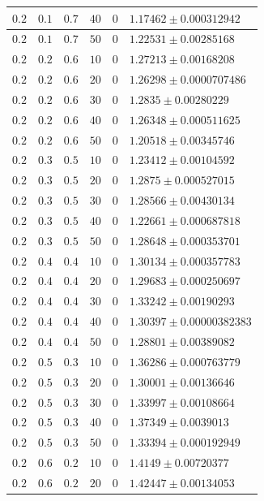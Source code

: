 \documentclass[14pt]{extreport}
\begin{document}
\begin{center}
\begin{longtable}{|p{1cm}|p{1cm}|p{1cm}|p{1cm}|p{1cm}|p{8cm}|}
$0.2$ & $0.1$ & $0.7$ & $40$ & $0$ & $1.17462 \pm 0.000312942$ \\ \hline
$0.2$ & $0.1$ & $0.7$ & $50$ & $0$ & $1.22531 \pm 0.00285168$ \\ \hline
$0.2$ & $0.2$ & $0.6$ & $10$ & $0$ & $1.27213 \pm 0.00168208$ \\ \hline
$0.2$ & $0.2$ & $0.6$ & $20$ & $0$ & $1.26298 \pm 0.0000707486$ \\ \hline
$0.2$ & $0.2$ & $0.6$ & $30$ & $0$ & $1.2835 \pm 0.00280229$ \\ \hline
$0.2$ & $0.2$ & $0.6$ & $40$ & $0$ & $1.26348 \pm 0.000511625$ \\ \hline
$0.2$ & $0.2$ & $0.6$ & $50$ & $0$ & $1.20518 \pm 0.00345746$ \\ \hline
$0.2$ & $0.3$ & $0.5$ & $10$ & $0$ & $1.23412 \pm 0.00104592$ \\ \hline
$0.2$ & $0.3$ & $0.5$ & $20$ & $0$ & $1.2875 \pm 0.000527015$ \\ \hline
$0.2$ & $0.3$ & $0.5$ & $30$ & $0$ & $1.28566 \pm 0.00430134$ \\ \hline
$0.2$ & $0.3$ & $0.5$ & $40$ & $0$ & $1.22661 \pm 0.000687818$ \\ \hline
$0.2$ & $0.3$ & $0.5$ & $50$ & $0$ & $1.28648 \pm 0.000353701$ \\ \hline
$0.2$ & $0.4$ & $0.4$ & $10$ & $0$ & $1.30134 \pm 0.000357783$ \\ \hline
$0.2$ & $0.4$ & $0.4$ & $20$ & $0$ & $1.29683 \pm 0.000250697$ \\ \hline
$0.2$ & $0.4$ & $0.4$ & $30$ & $0$ & $1.33242 \pm 0.00190293$ \\ \hline
$0.2$ & $0.4$ & $0.4$ & $40$ & $0$ & $1.30397 \pm 0.00000382383$ \\ \hline
$0.2$ & $0.4$ & $0.4$ & $50$ & $0$ & $1.28801 \pm 0.00389082$ \\ \hline
$0.2$ & $0.5$ & $0.3$ & $10$ & $0$ & $1.36286 \pm 0.000763779$ \\ \hline
$0.2$ & $0.5$ & $0.3$ & $20$ & $0$ & $1.30001 \pm 0.00136646$ \\ \hline
$0.2$ & $0.5$ & $0.3$ & $30$ & $0$ & $1.33997 \pm 0.00108664$ \\ \hline
$0.2$ & $0.5$ & $0.3$ & $40$ & $0$ & $1.37349 \pm 0.0039013$ \\ \hline
$0.2$ & $0.5$ & $0.3$ & $50$ & $0$ & $1.33394 \pm 0.000192949$ \\ \hline
$0.2$ & $0.6$ & $0.2$ & $10$ & $0$ & $1.4149 \pm 0.00720377$ \\ \hline
$0.2$ & $0.6$ & $0.2$ & $20$ & $0$ & $1.42447 \pm 0.00134053$ \\ \hline

\end{longtable}
\end{center}
\end{document}
